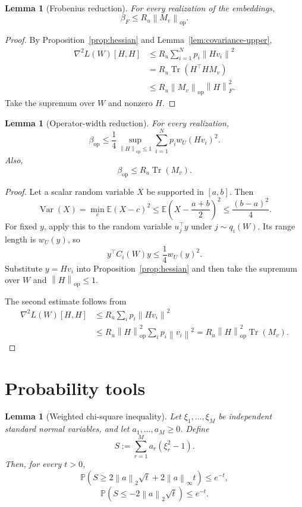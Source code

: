\documentclass[11pt]{article}
\newtheorem{lemma}[theorem]{Lemma}
\newcommand{\E}{\mathbb{E}}
\newcommand{\Pp}{\mathbb{P}}
\newcommand{\1}{\mathbf{1}}
\newcommand{\op}{\mathrm{op}}
\newcommand{\Tr}{\operatorname{Tr}}
\newcommand{\Var}{\operatorname{Var}}
\newcommand{\norm}[1]{\left\|#1\right\|}
\begin{document}
\begin{lemma}[Frobenius reduction]
\label{lem:frobenius-reduction}
For every realization of the embeddings,
\[
 \boxed{\beta_F\le R_u\norm{M_v}_{\op}.}
\]
\end{lemma}

\begin{proof}
By Proposition~\ref{prop:hessian} and
Lemma~\ref{lem:covariance-upper},
\begin{align*}
 \nabla^2L(W)[H,H]
 &\le
 R_u\sum_{i=1}^N p_i\norm{Hv_i}^2\\
 &=
 R_u\Tr(H^\top HM_v)\\
 &\le
 R_u\norm{M_v}_{\op}\norm{H}_F^2.
\end{align*}
Take the supremum over \(W\) and nonzero \(H\).
\end{proof}

\begin{lemma}[Operator-width reduction]
\label{lem:operator-reduction}
For every realization,
\[
 \boxed{
 \beta_{\op}
 \le
 \frac14
 \sup_{\norm{H}_{\op}\le1}
 \sum_{i=1}^N p_i w_U(Hv_i)^2.
 }
\]
Also,
\[
 \boxed{\beta_{\op}\le R_u\Tr(M_v).}
\]
\end{lemma}

\begin{proof}
Let a scalar random variable \(X\) be supported in \([a,b]\).  Then
\[
 \Var(X)
 =\min_c\E(X-c)^2
 \le
 \E\left(X-\frac{a+b}{2}\right)^2
 \le
 \frac{(b-a)^2}{4}.
\]
For fixed \(y\), apply this to the random variable \(u_j^\top y\) under
\(j\sim q_i(W)\).  Its range length is \(w_U(y)\), so
\[
 y^\top C_i(W)y\le\frac14w_U(y)^2.
\]
Substitute \(y=Hv_i\) into Proposition~\ref{prop:hessian} and then take the
supremum over \(W\) and \(\norm{H}_{\op}\le1\).

The second estimate follows from
\begin{align*}
 \nabla^2L(W)[H,H]
 &\le
 R_u\sum_i p_i\norm{Hv_i}^2\\
 &\le
 R_u\norm{H}_{\op}^2\sum_i p_i\norm{v_i}^2
 =
 R_u\norm{H}_{\op}^2\Tr(M_v).
\end{align*}
\end{proof}

\section{Probability tools}
\label{sec:probability-tools}

\begin{lemma}[Weighted chi-square inequality]
\label{lem:weighted-chi-square}
Let \(\xi_1,\ldots,\xi_M\) be independent standard normal variables, and let
\(a_1,\ldots,a_M\ge0\).  Define
\[
 S:=\sum_{r=1}^M a_r(\xi_r^2-1).
\]
Then, for every \(t>0\),
\[
 \Pp\left(
 S\ge2\norm{a}_2\sqrt t+2\norm{a}_\infty t
 \right)\le e^{-t},
\]
\[
 \Pp\left(
 S\le-2\norm{a}_2\sqrt t
 \right)\le e^{-t}.
\]
\end{lemma}
\end{document}
